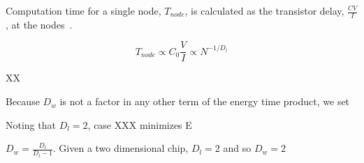 \documentclass[12pt]{article}
\begin{document}
%
%
%
%
%


Computation time for a single node, $T_{node}$, is calculated as the transistor
delay, $\frac{CV}{I}$, at the nodes~\cite{bakoglu90}. 

\begin{equation}
  T_{node} \propto C_0 \frac{V}{I}  \propto N^{-1/D_l}
\end{equation}



XX

Because $D_w$ is not a factor in any other
term of the energy time product, we set 

Noting that $D_l = 2$, case XXX minimizes E

$D_w = \frac{D_l}{D_l -1}$. Given a two dimensional chip, $D_l = 2$ and so $D_w = 2$ 
\end{document}
